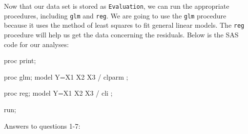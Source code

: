 \documentclass[oneside,10pt]{article}
\begin{document}
	Now that our data set is stored as \texttt{Evaluation}, we can run the appropriate procedures, including \texttt{glm} and \texttt{reg}. We are going to use the \texttt{glm} procedure because it uses the method of least squares to fit general linear models. The \texttt{reg} procedure will help us get the data concerning the residuals. Below is the SAS code for our analyses:
	\begin{Sascode}[store=math]
		proc print;

		proc glm;
			model Y=X1 X2 X3 / clparm ;
	
		proc reg;
			model Y=X1 X2 X3 / cli ;

		run;
	\end{Sascode}
   
	 \newpage
	Answers to questions 1-7:
\end{document}
